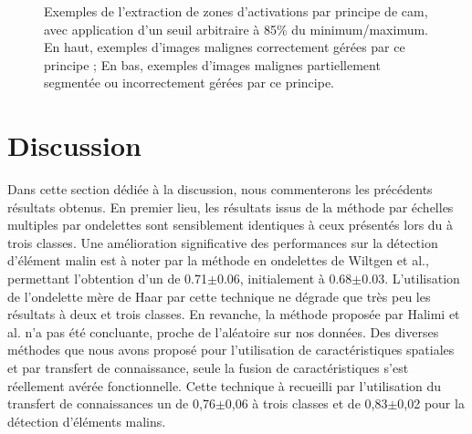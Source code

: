 \begin{figure}[H]
    \caption{Exemples de l'extraction de zones d'activations par principe de \gls{cam}, avec application d'un seuil arbitraire à 85\% du minimum/maximum. En haut, exemples d'images malignes correctement gérées par ce principe ; En bas, exemples d'images malignes partiellement segmentée ou incorrectement gérées par ce principe.}
    \label{fig:example_image_improvement_ft}
\end{figure}\par
\clearpage

\section{Discussion}
Dans cette section dédiée à la discussion, nous commenterons les précédents résultats obtenus. En premier lieu, les résultats issus de la méthode par échelles multiples par ondelettes sont sensiblement identiques à ceux présentés lors du  à trois classes. Une amélioration significative des performances sur la détection d'élément malin est à noter par la méthode en ondelettes de Wiltgen et al., permettant l'obtention d'un \fscore de 0.71$\pm$0.06, initialement à 0.68$\pm$0.03. L'utilisation de l'ondelette mère de Haar par cette technique ne dégrade que très peu les résultats à deux et trois classes. En revanche, la méthode proposée par Halimi et al. n'a pas été concluante, proche de l'aléatoire sur nos données. Des diverses méthodes que nous avons proposé pour l'utilisation de caractéristiques spatiales et par transfert de connaissance, seule la fusion de caractéristiques s'est réellement avérée fonctionnelle. Cette technique à recueilli par l'utilisation du transfert de connaissances un \fscore de 0,76$\pm$0,06 à trois classes et de 0,83$\pm$0,02 pour la détection d'éléments malins.\par

